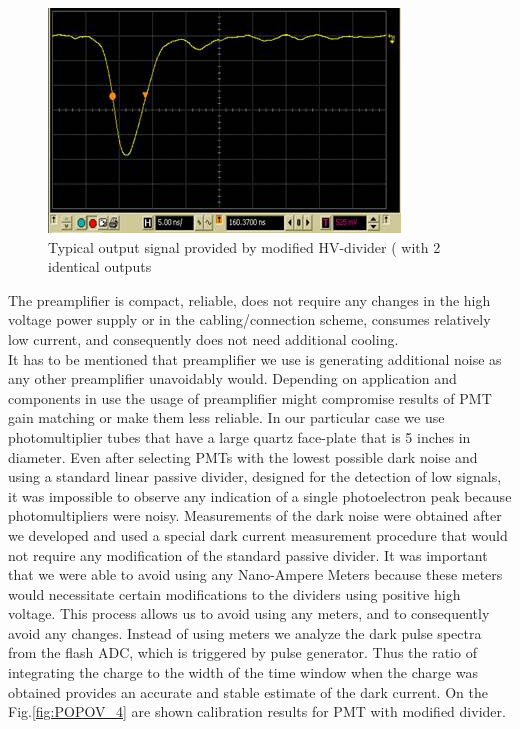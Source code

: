  \begin{figure}[!ht]
    \centering
    \includegraphics[width=1.0\linewidth,trim={0.0cm 0.0cm 0.0cm 0.0cm},clip]{images/POPOV_3.jpg}
    \caption{Typical output signal provided by modified HV-divider ( with 2 identical outputs}
    \label{fig:POPOV_3}
\end{figure}

The preamplifier is compact, reliable, does not require any changes in the high voltage power supply or in the cabling/connection scheme, consumes relatively low current, and consequently does not need additional cooling. \\
\indent It has to be mentioned that preamplifier we use is generating additional noise as any other preamplifier unavoidably would. Depending on application and components in use the usage of preamplifier might compromise results of PMT gain matching or make them less reliable. In our particular case we use photomultiplier tubes that have a large quartz face-plate that is 5 inches in diameter. Even after selecting PMTs with the lowest possible dark noise and using a standard linear passive divider, designed for the detection of low signals, it was impossible to observe any indication of a single photoelectron peak because photomultipliers were noisy. Measurements of the dark noise were obtained after we developed and used a special dark current measurement procedure that would not require any modification of the standard passive divider. It was important that we were able to avoid using any Nano-Ampere Meters because these meters would necessitate certain modifications to the dividers using positive high voltage. This process allows us to avoid using any meters, and to consequently avoid any changes. Instead of using meters we analyze the dark pulse spectra from the flash ADC, which is triggered by pulse generator. Thus the ratio of integrating the charge to the width of the time window when the charge was obtained provides an accurate and stable estimate of the dark current. On the Fig.\ref{fig:POPOV_4} are shown calibration results for PMT with modified divider.   

